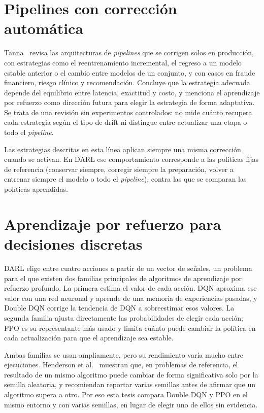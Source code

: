\section{Pipelines con corrección automática}
\label{sec:lit_selfhealing}

Tanna~\cite{tanna2025selfhealing} revisa las arquitecturas de \textit{pipelines} que se
corrigen solos en producción, con estrategias como el reentrenamiento incremental, el
regreso a un modelo estable anterior o el cambio entre modelos de un conjunto, y con casos
en fraude financiero, riesgo clínico y recomendación. Concluye que la estrategia adecuada
depende del equilibrio entre latencia, exactitud y costo, y menciona el aprendizaje por
refuerzo como dirección futura para elegir la estrategia de forma adaptativa. Se trata de
una revisión sin experimentos controlados: no mide cuánto recupera cada estrategia según
el tipo de drift ni distingue entre actualizar una etapa o todo el \textit{pipeline}.

Las estrategias descritas en esta línea aplican siempre una misma corrección cuando se
activan. En DARL ese comportamiento corresponde a las políticas fijas de referencia
(conservar siempre, corregir siempre la preparación, volver a entrenar siempre el modelo o
todo el \textit{pipeline}), contra las que se comparan las políticas aprendidas.

\section{Aprendizaje por refuerzo para decisiones discretas}
\label{sec:lit_rl}

DARL elige entre cuatro acciones a partir de un vector de señales, un problema para el que
existen dos familias principales de algoritmos de aprendizaje por refuerzo profundo. La
primera estima el valor de cada acción. DQN \cite{mnih2015dqn} aproxima ese valor con una
red neuronal y aprende de una memoria de experiencias pasadas, y Double DQN
\cite{vanhasselt2016ddqn} corrige la tendencia de DQN a sobreestimar esos valores. La
segunda familia ajusta directamente las probabilidades de elegir cada acción; PPO
\cite{schulman2017ppo} es su representante más usado y limita cuánto puede cambiar la
política en cada actualización para que el aprendizaje sea estable.

Ambas familias se usan ampliamente, pero su rendimiento varía mucho entre ejecuciones.
Henderson et al.~\cite{henderson2018matters} muestran que, en problemas de referencia, el
resultado de un mismo algoritmo puede cambiar de forma significativa solo por la semilla
aleatoria, y recomiendan reportar varias semillas antes de afirmar que un algoritmo supera
a otro. Por eso esta tesis compara Double DQN y PPO en el mismo entorno y con varias
semillas, en lugar de elegir uno de ellos sin evidencia.

